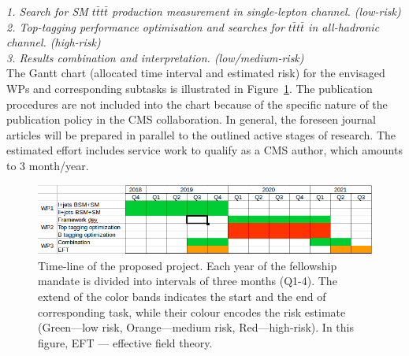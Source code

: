 %
%
%

\noindent\textit{1. Search for SM $t\bar{t}t\bar{t}$ production measurement in single-lepton channel. (low-risk)}\\



\noindent\textit{2. Top-tagging performance optimisation and searches for $t\bar{t}t\bar{t}$ in all-hadronic channel. (high-risk)}\\



\noindent\textit{3. Results combination and interpretation. (low/medium-risk)}\\


The Gantt chart (allocated time interval and estimated risk) for the envisaged WPs and corresponding subtasks is illustrated in Figure~\ref{fig:gantt_new}. The publication procedures are not included into the chart because of the specific nature of the publication policy in the CMS collaboration. In general, the foreseen journal articles will be prepared in parallel to the outlined active stages of research. The estimated effort includes service work to qualify as a CMS author, which amounts to 3 month/year.
%
\begin{figure}[h!]
\centering
\includegraphics[width=\linewidth]{figures/gantt_new}
        \caption{Time-line of the proposed project. Each year of the fellowship mandate is divided into intervals of three months (Q1-4). The extend of the color bands indicates the start and the end of corresponding task, while their colour encodes the risk estimate (Green---low risk, Orange---medium risk, Red---high-risk). In this figure, EFT --- effective field theory.}
\label{fig:gantt_new}
\end{figure}
